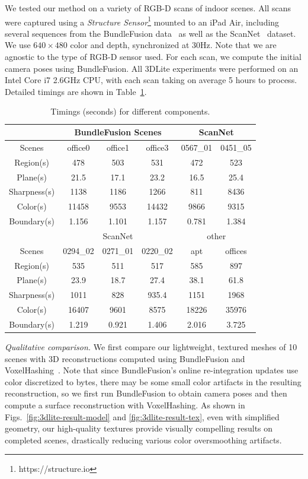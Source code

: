We tested our method on a variety of RGB-D scans of indoor scenes.
All scans were captured using a \emph{Structure Sensor}\footnote{https://structure.io} mounted to an iPad Air, including several sequences from the BundleFusion data~\cite{dai2016bundlefusion} as well as the ScanNet~\cite{dai2017scannet} dataset.
We use $640\times 480$ color and depth, synchronized at $30$Hz.
Note that we are agnostic to the type of RGB-D sensor used.
For each scan, we compute the initial camera poses using BundleFusion. 
All 3DLite experiments were performed on an Intel Core i7 2.6GHz CPU, with each scan taking on average 5 hours to process.
Detailed timings are shown in Table~\ref{table:3dlite-timing}.
\begin{table}
\center
\begin{tabular}{|c|c|c|c|c|c|}
\hline
& \multicolumn{3}{|c|}{BundleFusion Scenes} & \multicolumn{2}{|c|}{ScanNet}\\
\hline
Scenes & office0 & office1 & office3 & 0567\_01 & 0451\_05\\
\hline
Region(s) & 478 & 503 & 531 & 472 & 523\\
\hline
Plane(s) & 21.5 & 17.1 & 23.2 & 16.5 & 25.4\\
\hline
Sharpness(s) & 1138 & 1186 & 1266 & 811 & 8436\\
\hline
Color(s) & 11458 & 9553 & 14432 & 9866 & 9315\\
\hline
Boundary(s) & 1.156 & 1.101 & 1.157 & 0.781 & 1.384\\
\hline
\hline
& \multicolumn{3}{|c|}{ScanNet} & \multicolumn{2}{|c|}{other}\\
\hline
Scenes & 0294\_02 & 0271\_01 & 0220\_02 & apt & offices \\
\hline
Region(s) & 535 & 511 & 517 & 585 & 897\\
\hline
Plane(s) & 23.9 & 18.7 & 27.4 & 38.1 & 61.8\\
\hline
Sharpness(s) & 1011 & 828 & 935.4 & 1151 & 1968\\
\hline
Color(s) & 16407 & 9601 & 8575 & 18226 & 35976\\
\hline
Boundary(s) & 1.219 & 0.921 & 1.406 & 2.016 & 3.725\\
\hline
\end{tabular}
\caption{Timings (seconds) for different components.
}
\label{table:3dlite-timing}
\end{table}

\emph{Qualitative comparison.}
We first compare our lightweight, textured meshes of 10 scenes with 3D reconstructions computed using BundleFusion and VoxelHashing~\cite{niessner2013real}.
Note that since BundleFusion's online re-integration updates use color discretized to bytes, there may be some small color artifacts in the resulting reconstruction, so we first run BundleFusion to obtain camera poses and then compute a surface reconstruction with VoxelHashing.
As shown in Figs.~\ref{fig:3dlite-result-model} and \ref{fig:3dlite-result-tex}, even with simplified geometry, our high-quality textures provide visually compelling results on completed scenes, drastically reducing various color oversmoothing artifacts.

